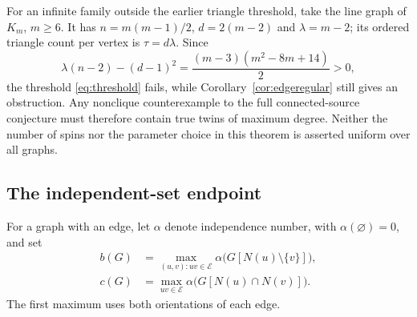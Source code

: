 \documentclass[11pt]{article}
\theoremstyle{remark}
\begin{document}
For an infinite family outside the earlier triangle threshold, take the
line graph of $K_m$, $m\geq6$. It has $n=m(m-1)/2$, $d=2(m-2)$ and
$\lambda=m-2$; its ordered triangle count per vertex is $\tau=d\lambda$.
Since
\[
 \lambda(n-2)-(d-1)^2
     =\frac{(m-3)(m^2-8m+14)}2>0,
\]
the threshold \eqref{eq:threshold} fails, while
Corollary~\ref{cor:edgeregular} still gives an obstruction.
Any nonclique counterexample to the full connected-source conjecture
must therefore contain true twins of maximum degree. Neither the number
of spins nor the parameter choice in this theorem is asserted uniform
over all graphs.

\subsection{The independent-set endpoint}

For a graph with an edge, let $\alpha$ denote independence number,
with $\alpha(\varnothing)=0$, and set
\begin{align}
 b(G)&=\max_{(u,v):uv\in\mathcal E}
             \alpha\bigl(G[N(u)\setminus\{v\}]\bigr),\\
 c(G)&=\max_{uv\in\mathcal E}
             \alpha\bigl(G[N(u)\cap N(v)]\bigr).       \label{eq:gapparameters}
\end{align}
The first maximum uses both orientations of each edge.
\end{document}
